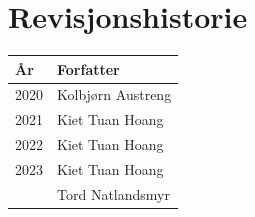 \section*{Revisjonshistorie}
\begin{center}
 \begin{tabular}{|p{1.5cm} p{5.5cm}|} 
 \hline
 År & Forfatter \\ [0.5ex] 
 \hline\hline
 2020 & Kolbjørn Austreng  \\ 
 \hline
 2021 & Kiet Tuan Hoang \\
 \hline
 2022 & Kiet Tuan Hoang \\
 \hline
  2023 & Kiet Tuan Hoang \\
       & Tord Natlandsmyr \\
 \hline
\end{tabular}
\end{center}

